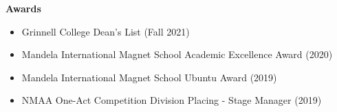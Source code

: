 \documentclass[letterpaper,11pt]{article}
\newcommand{\resheading}[1]{{\large \colorbox{mygrey}{\begin{minipage}{\textwidth}{\textbf{#1 \vphantom{p\^{E}}}}\end{minipage}}}}
\begin{document}

\resheading{Awards}
\begin{itemize}
    \item
	{Grinnell College Dean's List (Fall 2021)}
    \item
        {Mandela International Magnet School Academic Excellence Award (2020)}
    \item
        {Mandela International Magnet School Ubuntu Award (2019)}
    \item
        {NMAA One-Act Competition Division Placing - Stage Manager (2019)}
\end{itemize}
\end{document}
